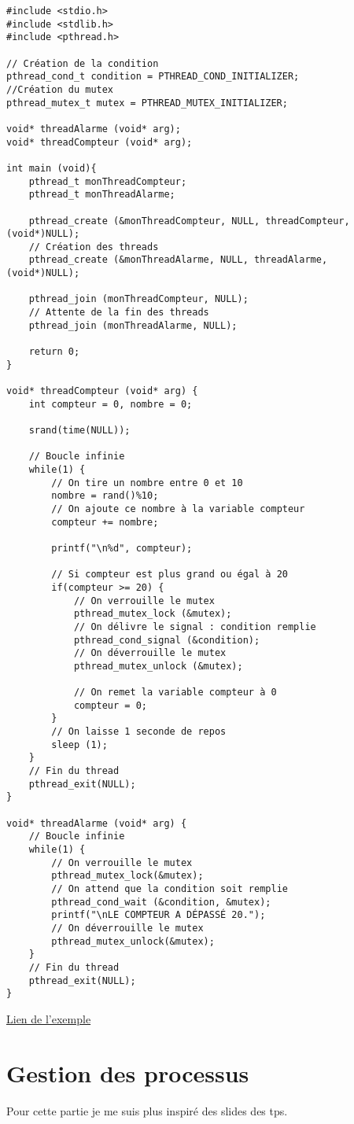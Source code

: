 \documentclass[a4paper]{article}
\begin{document}
\begin{lstlisting}
#include <stdio.h>
#include <stdlib.h>
#include <pthread.h>

// Création de la condition
pthread_cond_t condition = PTHREAD_COND_INITIALIZER;
//Création du mutex
pthread_mutex_t mutex = PTHREAD_MUTEX_INITIALIZER;

void* threadAlarme (void* arg);
void* threadCompteur (void* arg);

int main (void){
	pthread_t monThreadCompteur;
	pthread_t monThreadAlarme;

	pthread_create (&monThreadCompteur, NULL, threadCompteur, (void*)NULL);
    // Création des threads
	pthread_create (&monThreadAlarme, NULL, threadAlarme, (void*)NULL);

	pthread_join (monThreadCompteur, NULL);
    // Attente de la fin des threads
	pthread_join (monThreadAlarme, NULL);

	return 0;
}

void* threadCompteur (void* arg) {
	int compteur = 0, nombre = 0;

	srand(time(NULL));

    // Boucle infinie
	while(1) {
        // On tire un nombre entre 0 et 10
		nombre = rand()%10;
        // On ajoute ce nombre à la variable compteur
		compteur += nombre;

		printf("\n%d", compteur);

        // Si compteur est plus grand ou égal à 20
		if(compteur >= 20) {
            // On verrouille le mutex
			pthread_mutex_lock (&mutex);
            // On délivre le signal : condition remplie
			pthread_cond_signal (&condition);
            // On déverrouille le mutex
			pthread_mutex_unlock (&mutex);

            // On remet la variable compteur à 0
			compteur = 0;
		}
        // On laisse 1 seconde de repos
		sleep (1);
	}
    // Fin du thread
	pthread_exit(NULL);
}

void* threadAlarme (void* arg) {
    // Boucle infinie
	while(1) {
        // On verrouille le mutex
		pthread_mutex_lock(&mutex);
        // On attend que la condition soit remplie
		pthread_cond_wait (&condition, &mutex);
		printf("\nLE COMPTEUR A DÉPASSÉ 20.");
        // On déverrouille le mutex
		pthread_mutex_unlock(&mutex);
	}
    // Fin du thread
	pthread_exit(NULL);
}
\end{lstlisting}
\href{https://openclassrooms.com/courses/la-programmation-systeme-en-c-sous-unix/les-threads-3#/id/r-1515355}{Lien de l'exemple}
\section{Gestion des processus}
Pour cette partie je me suis plus inspiré des slides des tps.
\end{document}

